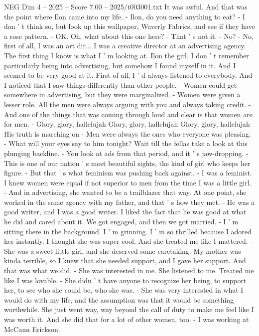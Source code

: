 \begin{textsample}{NEG Dim 4 – 2025 – Score 7.00 – 2025/t003001.txt}
It was awful.
And that was the point where Ilon came into my life. - Ilon, do you need anything to eat? - I don ' t think so, but look up this wallpaper, Waverly Fabrics, and see if they have a rose pattern. - OK.
Oh, what about this one here? - That ' s not it. - No? - No, first of all, I was an art dir...
I was a creative director at an advertising agency.
The first thing I know is what I ' m looking at.
Ilon the girl.
I don ' t remember particularly being into advertising, but somehow I found myself in it.
And I seemed to be very good at it.
First of all, I ' d always listened to everybody.
And I noticed that I saw things differently than other people. - Women could get somewhere in advertising, but they were marginalized. - Women were given a lesser role.
All the men were always arguing with you and always taking credit. - And one of the things that was coming through loud and clear is that women are for men. - Glory, glory, hallelujah Glory, glory, hallelujah Glory, glory, hallelujah His truth is marching on - Men were always the ones who everyone was pleasing. - What will your eyes say to him tonight?
Wait till the fellas take a look at this plunging backline. - You look at ads from that period, and it ' s jaw-dropping. - This is one of our nation ' s most beautiful sights, the kind of girl who keeps her figure. - But that ' s what feminism was pushing back against. - I was a feminist.
I knew women were equal if not superior to men from the time I was a little girl. - And in advertising, she wanted to be a trailblazer that way.
At one point, she worked in the same agency with my father, and that ' s how they met. - He was a good writer, and I was a good writer.
I liked the fact that he was good at what he did and cared about it.
We got engaged, and then we got married. - I ' m sitting there in the background.
I ' m grinning.
I ' m so thrilled because I adored her instantly.
I thought she was super cool.
And she treated me like I mattered. - She was a sweet little girl, and she deserved some caretaking.
My mother was kinda terrible, so I knew that she needed support, and I gave her support.
And that was what we did. - She was interested in me.
She listened to me.
Treated me like I was lovable. - She didn ' t have anyone to recognize her being, to support her, to see who she could be, who she was. - She was very interested in what I would do with my life, and the assumption was that it would be something worthwhile.
She just went way, way beyond the call of duty to make me feel like I was worth it.
And she did that for a lot of other women, too. - I was working at McCann Erickson.

\end{textsample}
